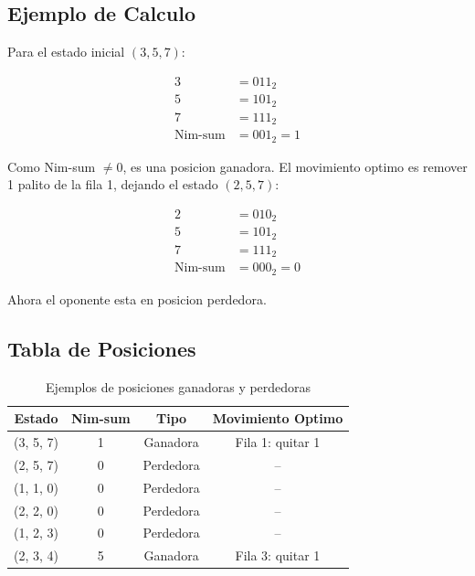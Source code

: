 \documentclass[12pt,a4paper]{article}
\theoremstyle{definition}
\begin{document}
\subsection{Ejemplo de Calculo}

Para el estado inicial $(3, 5, 7)$:

\begin{align}
    3 &= 011_2 \\
    5 &= 101_2 \\
    7 &= 111_2 \\
    \hline
    \text{Nim-sum} &= 001_2 = 1
\end{align}

Como Nim-sum $\neq 0$, es una posicion ganadora. El movimiento optimo es remover 1 palito de la fila 1, dejando el estado $(2, 5, 7)$:

\begin{align}
    2 &= 010_2 \\
    5 &= 101_2 \\
    7 &= 111_2 \\
    \hline
    \text{Nim-sum} &= 000_2 = 0
\end{align}

Ahora el oponente esta en posicion perdedora.

\subsection{Tabla de Posiciones}

\begin{table}[H]
\centering
\caption{Ejemplos de posiciones ganadoras y perdedoras}
\begin{tabular}{cccc}
\toprule
\textbf{Estado} & \textbf{Nim-sum} & \textbf{Tipo} & \textbf{Movimiento Optimo} \\
\midrule
(3, 5, 7) & 1 & Ganadora & Fila 1: quitar 1 \\
(2, 5, 7) & 0 & Perdedora & -- \\
(1, 1, 0) & 0 & Perdedora & -- \\
(2, 2, 0) & 0 & Perdedora & -- \\
(1, 2, 3) & 0 & Perdedora & -- \\
(2, 3, 4) & 5 & Ganadora & Fila 3: quitar 1 \\
\bottomrule
\end{tabular}
\end{table}

\end{document}
